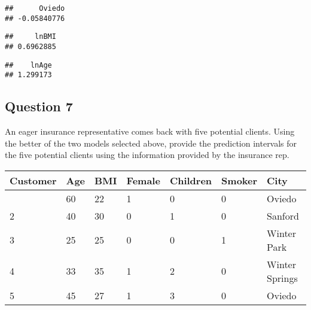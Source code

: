 \documentclass[
]{article}
\newenvironment{Shaded}{\begin{snugshade}}{\end{snugshade}}
\newcommand{\NormalTok}[1]{#1}
\newcommand{\SpecialCharTok}[1]{\textcolor[rgb]{0.81,0.36,0.00}{\textbf{#1}}}
\newcommand{\StringTok}[1]{\textcolor[rgb]{0.31,0.60,0.02}{#1}}
\begin{document}
\begin{Shaded}
\end{Shaded}

\begin{verbatim}
##      Oviedo 
## -0.05840776
\end{verbatim}

\begin{Shaded}
\end{Shaded}

\begin{verbatim}
##     lnBMI 
## 0.6962885
\end{verbatim}

\begin{Shaded}
\end{Shaded}

\begin{verbatim}
##    lnAge 
## 1.299173
\end{verbatim}

\subsection{Question 7}\label{question-7}

An eager insurance representative comes back with five potential
clients. Using the better of the two models selected above, provide the
prediction intervals for the five potential clients using the
information provided by the insurance rep.

\begin{longtable}[]{@{}lllllll@{}}
\toprule\noalign{}
Customer & Age & BMI & Female & Children & Smoker & City \\
\midrule\noalign{}
\endhead
\bottomrule\noalign{}
\endlastfoot
1 & 60 & 22 & 1 & 0 & 0 & Oviedo \\
2 & 40 & 30 & 0 & 1 & 0 & Sanford \\
3 & 25 & 25 & 0 & 0 & 1 & Winter Park \\
4 & 33 & 35 & 1 & 2 & 0 & Winter Springs \\
5 & 45 & 27 & 1 & 3 & 0 & Oviedo \\
\end{longtable}
\end{document}
